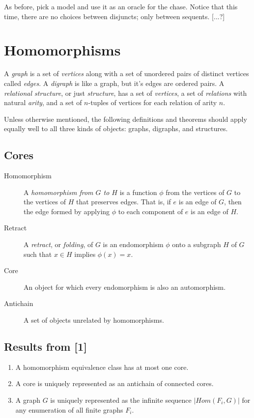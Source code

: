 \documentclass[12pt]{article}
\begin{document}
  As before, pick a model and use it as an oracle for the
  chase. Notice that this time, there are no choices between
  disjuncts; only between sequents. [...?]



\section{Homomorphisms}

  A \emph{graph} is a set of \emph{vertices} along with a set of
  unordered pairs of distinct vertices called \emph{edges}. A
  \emph{digraph} is like a graph, but it's edges are ordered pairs. A
  \emph{relational structure}, or just \emph{structure}, has a set of
  \emph{vertices}, a set of \emph{relations} with natural
  \emph{arity}, and a set of $n$-tuples of vertices for each relation
  of arity $n$.

  Unless otherwise mentioned, the following definitions and theorems
  should apply equally well to all three kinds of objects: graphs,
  digraphs, and structures.

\subsection{Cores}

  \begin{description}
  \item[Homomorphism] A \emph{homomorphism from $G$ to $H$} is a
    function $\phi$ from the vertices of $G$ to the vertices of $H$
    that preserves edges. That is, if $e$ is an edge of $G$, then the
    edge formed by applying $\phi$ to each component of $e$ is an edge
    of $H$.
  \item[Retract] A \emph{retract}, or \emph{folding}, of $G$ is an
    endomorphism $\phi$ onto a subgraph $H$ of $G$ such that $x \in H$
    implies $\phi(x) = x$.
  \item[Core] An object for which every endomorphism is also an
    automorphism.
  \item[Antichain] A set of objects unrelated by homomorphisms.
  \end{description}

\subsection{Results from [1]}
  \begin{enumerate}
  \item A homomorphism equivalence class has at most one core.
  \item A core is uniquely represented as an antichain of connected
    cores.
  \item A graph $G$ is uniquely represented as the infinite sequence
    $|Hom(F_i, G)|$ for any enumeration of all finite graphs $F_i$.
  \end{enumerate}
\end{document}

